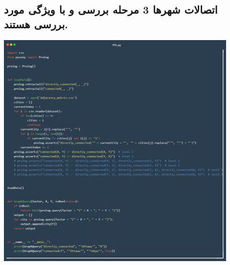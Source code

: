 \documentclass[12pt, dvipsnames, svgnames, x11names,]{article}
\begin{document}
		\subsection{اتصالات شهرها 3 مرحله بررسی و با ویژگی  مورد بررسی هستند.}
			\begin{center}
				\includegraphics[width=12cm]{images/03}
			\end{center}
			
	
\end{document}
